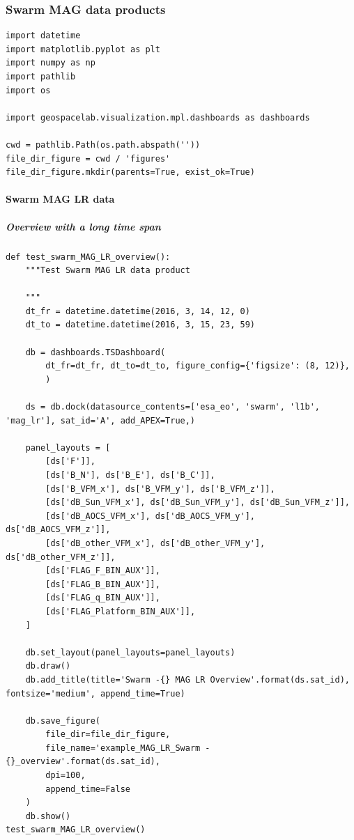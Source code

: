 \subsubsection{Swarm MAG data products}

\begin{verbatim}
import datetime
import matplotlib.pyplot as plt
import numpy as np
import pathlib
import os

import geospacelab.visualization.mpl.dashboards as dashboards

cwd = pathlib.Path(os.path.abspath(''))
file_dir_figure = cwd / 'figures'
file_dir_figure.mkdir(parents=True, exist_ok=True)
\end{verbatim}

\paragraph{Swarm MAG LR data}

\subparagraph{Overview with a long time span}

\begin{verbatim}
def test_swarm_MAG_LR_overview():
    """Test Swarm MAG LR data product
    
    """
    dt_fr = datetime.datetime(2016, 3, 14, 12, 0)
    dt_to = datetime.datetime(2016, 3, 15, 23, 59)

    db = dashboards.TSDashboard(
        dt_fr=dt_fr, dt_to=dt_to, figure_config={'figsize': (8, 12)},
        )

    ds = db.dock(datasource_contents=['esa_eo', 'swarm', 'l1b', 'mag_lr'], sat_id='A', add_APEX=True,)

    panel_layouts = [
        [ds['F']],
        [ds['B_N'], ds['B_E'], ds['B_C']],
        [ds['B_VFM_x'], ds['B_VFM_y'], ds['B_VFM_z']],
        [ds['dB_Sun_VFM_x'], ds['dB_Sun_VFM_y'], ds['dB_Sun_VFM_z']],
        [ds['dB_AOCS_VFM_x'], ds['dB_AOCS_VFM_y'], ds['dB_AOCS_VFM_z']],
        [ds['dB_other_VFM_x'], ds['dB_other_VFM_y'], ds['dB_other_VFM_z']],
        [ds['FLAG_F_BIN_AUX']],
        [ds['FLAG_B_BIN_AUX']],
        [ds['FLAG_q_BIN_AUX']],
        [ds['FLAG_Platform_BIN_AUX']],
    ]

    db.set_layout(panel_layouts=panel_layouts)
    db.draw()
    db.add_title(title='Swarm -{} MAG LR Overview'.format(ds.sat_id), fontsize='medium', append_time=True)

    db.save_figure(
        file_dir=file_dir_figure, 
        file_name='example_MAG_LR_Swarm -{}_overview'.format(ds.sat_id), 
        dpi=100, 
        append_time=False
    )
    db.show()
test_swarm_MAG_LR_overview()
\end{verbatim}

